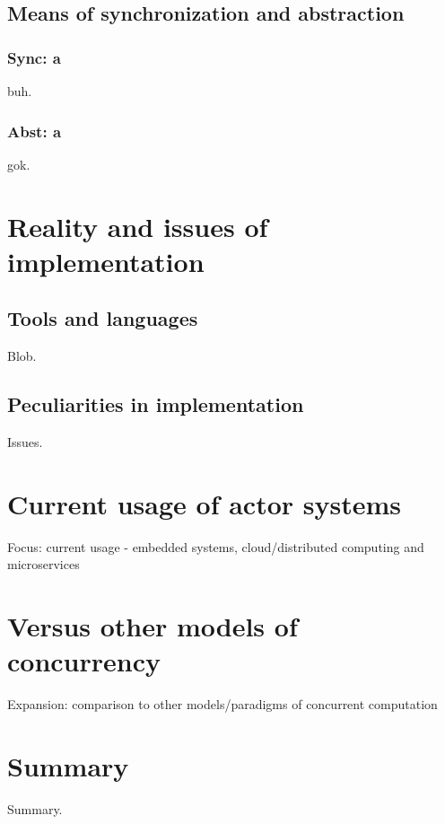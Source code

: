 \documentclass[A4]{article}
\begin{document}
\subsection{Means of synchronization and abstraction}
\subsubsection{Sync: a}
buh.
\subsubsection{Abst: a}
gok.

\section{Reality and issues of implementation}
\subsection{Tools and languages}
Blob.

\subsection{Peculiarities in implementation}
Issues.

\section{Current usage of actor systems}
Focus: current usage - embedded systems, cloud/distributed computing and microservices

\section{Versus other models of concurrency}
Expansion: comparison to other models/paradigms of concurrent computation

\section{Summary}
\label{summary}
Summary.

\nocite{robotron,
stonx,vice,650sim,herculessim,zib,4004,thermal1,thermal2,rojas}




\end{document}
